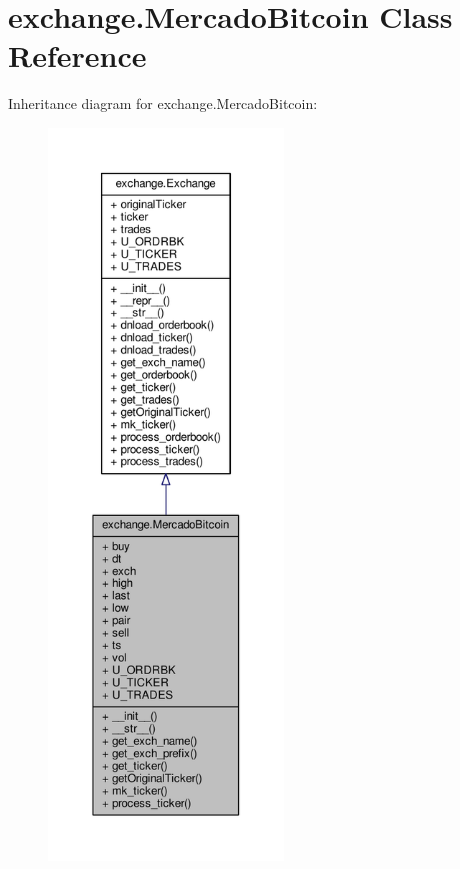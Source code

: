 \hypertarget{classexchange_1_1_mercado_bitcoin}{}\section{exchange.\+Mercado\+Bitcoin Class Reference}
\label{classexchange_1_1_mercado_bitcoin}


Inheritance diagram for exchange.\+Mercado\+Bitcoin\+:\nopagebreak
\begin{figure}[H]
\begin{center}
\leavevmode
\includegraphics[height=550pt]{classexchange_1_1_mercado_bitcoin__inherit__graph}
\end{center}
\end{figure}


